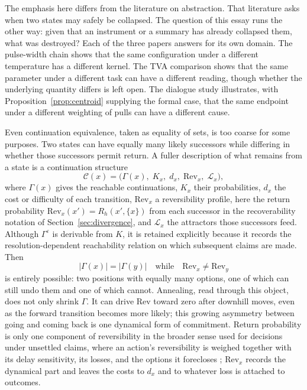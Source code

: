 \documentclass[11pt]{article}
\theoremstyle{definition}
\theoremstyle{remark}
\begin{document}
The emphasis here differs from the literature on abstraction. That literature asks when two states may safely be collapsed. The question of this essay runs the other way: given that an instrument or a summary has already collapsed them, what was destroyed? Each of the three papers answers for its own domain. The pulse-width chain shows that the same configuration under a different temperature has a different kernel. The TVA comparison shows that the same parameter under a different task can have a different reading, though whether the underlying quantity differs is left open. The dialogue study illustrates, with Proposition~\ref{prop:centroid} supplying the formal case, that the same endpoint under a different weighting of pulls can have a different cause.

Even continuation equivalence, taken as equality of sets, is too coarse for some purposes. Two states can have equally many likely successors while differing in whether those successors permit return. A fuller description of what remains from a state is a continuation structure
\begin{equation}
\mathcal{C}(x) = \big( \Gamma(x),\; K_x,\; d_x,\; \mathrm{Rev}_x,\; \mathcal{L}_x \big),
\end{equation}
where $\Gamma(x)$ gives the reachable continuations, $K_x$ their probabilities, $d_x$ the cost or difficulty of each transition, $\mathrm{Rev}_x$ a reversibility profile, here the return probability $\mathrm{Rev}_x(x') = R_h(x', \{x\})$ from each successor in the recoverability notation of Section~\ref{sec:divergence}, and $\mathcal{L}_x$ the attractors those successors feed. Although $\Gamma^\varepsilon$ is derivable from $K$, it is retained explicitly because it records the resolution-dependent reachability relation on which subsequent claims are made. Then
\begin{equation}
|\Gamma(x)| = |\Gamma(y)| \quad\text{while}\quad \mathrm{Rev}_x \neq \mathrm{Rev}_y
\end{equation}
is entirely possible: two positions with equally many options, one of which can still undo them and one of which cannot. Annealing, read through this object, does not only shrink $\Gamma$. It can drive $\mathrm{Rev}$ toward zero after downhill moves, even as the forward transition becomes more likely; this growing asymmetry between going and coming back is one dynamical form of commitment. Return probability is only one component of reversibility in the broader sense used for decisions under unsettled claims, where an action's reversibility is weighed together with its delay sensitivity, its losses, and the options it forecloses \cite{flyxion-reversibility}; $\mathrm{Rev}_x$ records the dynamical part and leaves the costs to $d_x$ and to whatever loss is attached to outcomes.
\end{document}
